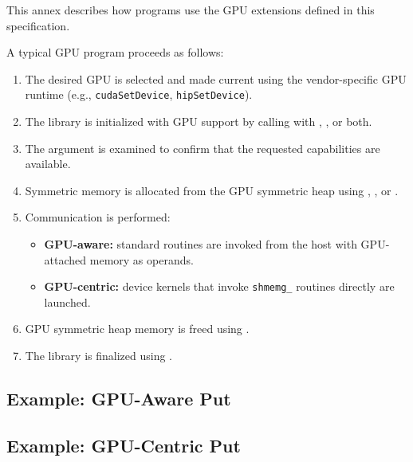 
This annex describes how \openshmem programs use the GPU extensions defined in
this specification.

A typical \openshmem GPU program proceeds as follows:

\begin{enumerate}
\item The desired \ac{GPU} is selected and made current using the vendor-specific
  GPU runtime (e.g., \texttt{cudaSetDevice}, \texttt{hipSetDevice}).
\item The \openshmem library is initialized with GPU support by calling
   with ,
  , or both.
\item The  argument is examined to confirm that the requested
  capabilities are available.
\item Symmetric memory is allocated from the \ac{GPU} symmetric heap using
  , , or .
\item Communication is performed:
  \begin{itemize}
  \item \textbf{GPU-aware:} standard \openshmem routines are invoked from the
    host with GPU-attached memory as operands.
  \item \textbf{GPU-centric:} device kernels that invoke \texttt{shmemg\_}
    routines directly are launched.
  \end{itemize}
\item \ac{GPU} symmetric heap memory is freed using .
\item The \openshmem library is finalized using .
\end{enumerate}

\subsection*{Example: GPU-Aware Put}



\subsection*{Example: GPU-Centric Put}



\clearpage

